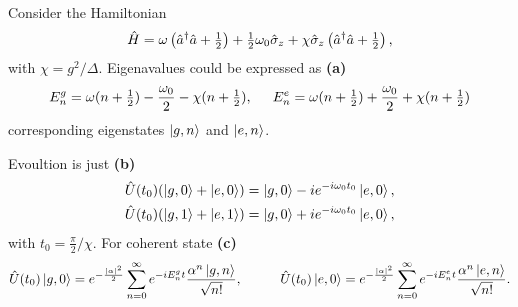 Consider the Hamiltonian
\begin{equation*}
  \hat{H} = \omega\left(\hat{a}^{\dag} \hat{a} + \tfrac{1}{2}\right) + \tfrac{1}{2} \omega_0 \hat{\sigma}_z + \chi \hat{\sigma}_z \left(
    \hat{a}^{\dag} \hat{a} + \tfrac{1}{2}
  \right),
\end{equation*}
with $\chi = g^2 / \Delta$. Eigenavalues could be expressed as \textbf{(a)}
\begin{equation*}
  E_n^g = \omega (n + \tfrac{1}{2}) - \frac{\omega_0}{2} -\chi (n + \tfrac{1}{2}),
  \hspace{5 mm} 
     E_n^e = \omega (n + \tfrac{1}{2}) + \frac{\omega_0}{2} +\chi (n + \tfrac{1}{2})
\end{equation*}
corresponding eigenstates $\left| g, n \right\rangle$ and $\left| e, n \right\rangle$.

Evoultion is just \textbf{(b)}
\begin{align*}
  \hat{U}(t_0) (\left| g,0 \right\rangle + \left| e,0 \right\rangle) &= \left| g,0 \right\rangle - i e^{-i \omega_0 t_0} \left| e,0 \right\rangle, \\
  \hat{U}(t_0) (\left| g,1 \right\rangle + \left| e,1 \right\rangle) &= \left| g,0 \right\rangle + i e^{-i \omega_0 t_0} \left| e,0 \right\rangle,
\end{align*}
with $t_0 = \tfrac{\pi}{2} / \chi$.  For coherent state  \textbf{(c)}
\begin{equation*}
  \hat{U}(t_0) \ket{g,0}  = e^{-\frac{|\alpha|^2}{2}} \sum_{n=0}^{\infty} e^{-i E_n^g t} \frac{\alpha^n \ket{g, n}}{\sqrt{n!}},
  \hspace{10 mm} 
  \hat{U}(t_0) \ket{e,0}  = e^{-\frac{|\alpha|^2}{2}} \sum_{n=0}^{\infty} e^{-i E_n^e t} \frac{\alpha^n \ket{e, n}}{\sqrt{n!}}.
\end{equation*}

